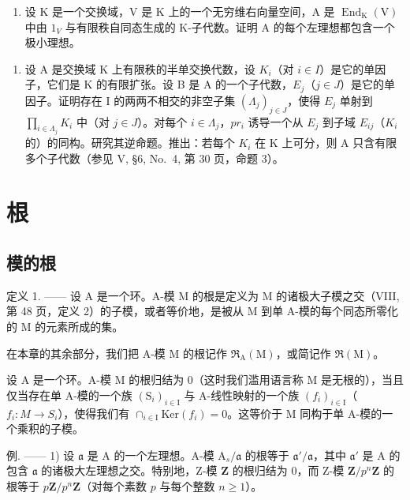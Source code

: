 \begin{enumerate}
\def\labelenumi{\alph{enumi})}
\setcounter{enumi}{1}
\tightlist
\item
  设 K 是一个交换域，V 是 K 上的一个无穷维右向量空间，A 是 \(\operatorname{End}_{\mathrm{K}}(\mathrm{V})\) 中由 \(1_{V}\) 与有限秩自同态生成的 K-子代数。证明 A 的每个左理想都包含一个极小理想。
\end{enumerate}

\begin{enumerate}
\def\labelenumi{\arabic{enumi})}
\setcounter{enumi}{5}
\tightlist
\item
  设 A 是交换域 K 上有限秩的半单交换代数，设 \(K_{i}\)（对 \(i \in I\)）是它的单因子，它们是 K 的有限扩张。设 B 是 A 的一个子代数，\(E_{j}\)（\(j \in J\)）是它的单因子。证明存在 I 的两两不相交的非空子集 \((\Lambda_{j})_{j \in J}\)，使得 \(E_{j}\) 单射到 \(\prod_{i \in \Lambda_{j}} K_{i}\) 中（对 \(j \in J\)）。对每个 \(i \in \Lambda_{j}\)，\(pr_{i}\) 诱导一个从 \(E_{j}\) 到子域 \(E_{ij}\)（\(K_{i}\) 的）的同构。研究其逆命题。推出：若每个 \(K_{i}\) 在 K 上可分，则 A 只含有限多个子代数（参见 V, §6, No.~4, 第 30 页，命题 3）。
\end{enumerate}

\section{根}

\subsection{模的根}

定义 1. —— 设 A 是一个环。A-模 M 的根是定义为 M 的诸极大子模之交（VIII, 第 48 页，定义 2）的子模，或者等价地，是被从 M 到单 A-模的每个同态所零化的 M 的元素所成的集。

在本章的其余部分，我们把 A-模 M 的根记作 \(\mathfrak{R}_{\mathrm{A}}(\mathrm{M})\)，或简记作 \(\mathfrak{R}(\mathrm{M})\)。

设 A 是一个环。A-模 M 的根归结为 0（这时我们滥用语言称 M 是无根的），当且仅当存在单 A-模的一个族 \((\mathrm{S}_{i})_{i\in\mathrm{I}}\) 与 A-线性映射的一个族 \((f_{i})_{i\in\mathrm{I}}\)（\(f_{i}:M\to S_{i}\)），使得我们有 \(\cap_{i\in\mathrm{I}}\mathrm{Ker}(f_{i})=0\)。这等价于 M 同构于单 A-模的一个乘积的子模。

例. —— 1) 设 \(\mathfrak{a}\) 是 A 的一个左理想。A-模 \(\mathrm{A}_s / \mathfrak{a}\) 的根等于 \(\mathfrak{a}' / \mathfrak{a}\)，其中 \(\mathfrak{a}'\) 是 A 的包含 \(\mathfrak{a}\) 的诸极大左理想之交。特别地，Z-模 \(\mathbf{Z}\) 的根归结为 0，而 Z-模 \(\mathbf{Z} / p^n\mathbf{Z}\) 的根等于 \(p\mathbf{Z} / p^n\mathbf{Z}\)（对每个素数 \(p\) 与每个整数 \(n \geqslant 1\)）。

